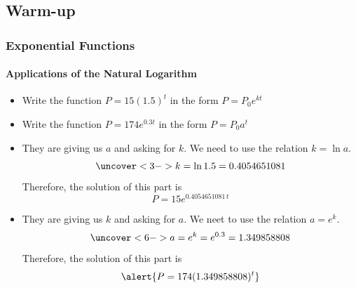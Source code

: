 \documentclass[9pt,xcolor=x11names,compress]{beamer}
\begin{document}
\subsection{Warm-up}
\begin{frame}\frametitle{Exponential Functions}
  \framesubtitle{Applications of the Natural Logarithm}  
  \begin{example}
  \begin{itemize}
    \item \alert<2-4>{Write the function $P=15(1.5)^t$ in the form $P=P_0e^{kt}$}
    \item \alert<5->{Write the function $P=174e^{0.3t}$ in the form $P=P_0 a^t$}
  \end{itemize}
  \end{example}
  \begin{itemize}
    \item<2-> They are giving us $a$ and asking for $k$.  We need to use the relation $k=\ln a$.
    \begin{equation*}
      \uncover<3->{k = \ln 1.5 = 0.4054651081}
    \end{equation*}
    \pause\pause\pause
    Therefore, the solution of this part is 
    \begin{equation*}
      P=15e^{0.4054651081\, t}
    \end{equation*}
    \item<5-> They are giving us $k$ and asking for $a$.  We neet to use the relation $a=e^k$.
    \begin{equation*}
      \uncover<6->{a=e^k=e^{0.3}=1.349858808}
    \end{equation*}
    \pause\pause\pause Therefore, the solution of this part is
    \begin{equation*}
      \alert{P=174(1.349858808)^t}  
    \end{equation*}
  \end{itemize}
\end{frame}
\end{document}

